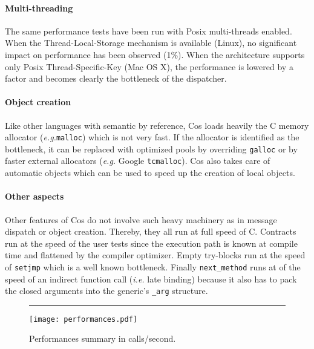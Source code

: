 \documentclass[preprint,10pt]{sigplanconf}
\newcommand{\abbrev}[1]{{\em #1}\xspace}
\newcommand{\ie}{\abbrev{i.e.}}
\newcommand{\eg}{\abbrev{e.g.}}
\newcommand{\acronym}[1]{{\sc #1}\xspace}
\newcommand{\Posix}  {\acronym{Posix}}
\newcommand{\ProgLang}[1]{{\sc #1}\xspace}
\newcommand{\Cos}       {\ProgLang{Cos}}
\newcommand{\hr}{\rule{\columnwidth}{0.33pt}}
\newcommand{\code}[1]{\lstinline[language=COS,style=samplecode]|#1|}
\begin{document}
\paragraph{Multi-threading}

The same performance tests have been run with \Posix multi-threads enabled. When the Thread-Local-Storage mechanism is available (Linux), no significant impact on performance has been observed (1\%). When the architecture supports only \Posix Thread-Specific-Key (Mac OS X), the performance is lowered by a factor  and becomes clearly the bottleneck of the dispatcher.

\paragraph{Object creation}

Like other languages with semantic by reference, \Cos loads heavily the C memory allocator (\eg \code{malloc}) which is not very fast. If the allocator is identified as the bottleneck, it can be replaced with optimized pools by overriding \code{galloc} or by faster external allocators (\eg Google \code{tcmalloc}). \Cos also takes care of automatic objects which can be used to speed up the creation of local objects.

\paragraph{Other aspects}

Other features of \Cos do not involve such heavy machinery as in message dispatch or object creation. There\-by, they all run at full speed of C. Contracts run at the speed of the user tests since the execution path is known at compile time and flattened by the compiler optimizer. Empty try-blocks run at the speed of \code{setjmp} which is a well known bottleneck. Finally \code{next_method} runs at  of the speed of an indirect function call (\ie late binding) because it also has to pack the closed arguments into the generic's \code{_arg} structure.

\begin{figure}\hr
\begin{center}
\vspace{-2mm}
\texttt{[image: performances.pdf]}
\vspace{-2.5mm}
\end{center}
\caption{Performances summary in  calls/second.\label{fig:perf}}
\end{figure}
\end{document}
